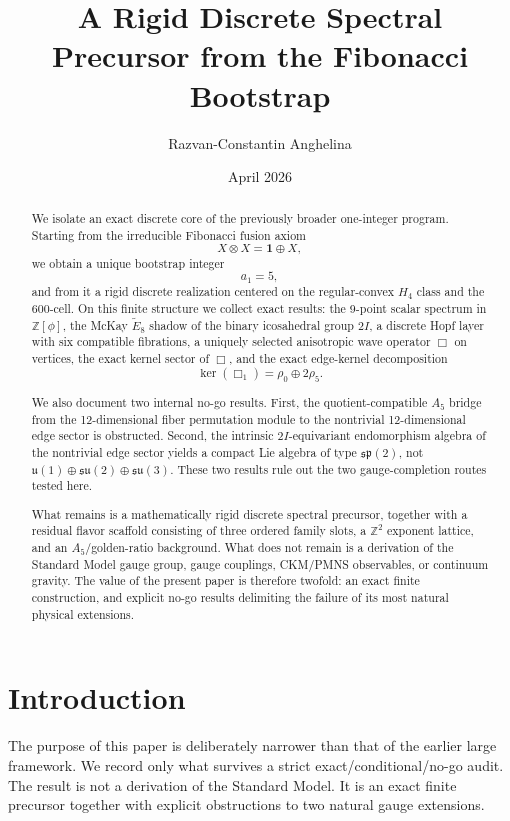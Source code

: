 \documentclass[12pt,a4paper]{article}
\title{\textbf{A Rigid Discrete Spectral Precursor from the Fibonacci Bootstrap}}
\author{Razvan-Constantin Anghelina}
\date{April 2026}
\theoremstyle{definition}
\begin{document}
\maketitle

\begin{abstract}
We isolate an exact discrete core of the previously broader one-integer program.
Starting from the irreducible Fibonacci fusion axiom
\[
X \otimes X = \mathbf{1} \oplus X,
\]
we obtain a unique bootstrap integer
\[
a_1 = 5,
\]
and from it a rigid discrete realization centered on the regular-convex
\(H_4\) class and the 600-cell. On this finite structure we collect exact
results: the 9-point scalar spectrum in \(\mathbb{Z}[\phi]\), the McKay
\(\widetilde E_8\) shadow of the binary icosahedral group \(2I\), a discrete
Hopf layer with six compatible fibrations, a uniquely selected anisotropic wave
operator \(\Box\) on vertices, the exact kernel sector of \(\Box\), and the
exact edge-kernel decomposition
\[
\ker(\Box_1)=\rho_0 \oplus 2\rho_5.
\]

We also document two internal no-go results. First, the quotient-compatible
\(A_5\) bridge from the 12-dimensional fiber permutation module to the
nontrivial 12-dimensional edge sector is obstructed. Second, the intrinsic
\(2I\)-equivariant endomorphism algebra of the nontrivial edge sector yields a
compact Lie algebra of type \(\mathfrak{sp}(2)\), not
\(\mathfrak{u}(1)\oplus\mathfrak{su}(2)\oplus\mathfrak{su}(3)\). These two
results rule out the two gauge-completion routes tested here.

What remains is a mathematically rigid discrete spectral precursor, together
with a residual flavor scaffold consisting of three ordered family slots, a
\(\mathbb{Z}^2\) exponent lattice, and an \(A_5\)/golden-ratio background.
What does not remain is a derivation of the Standard Model gauge group, gauge
couplings, CKM/PMNS observables, or continuum gravity. The value of the present
paper is therefore twofold: an exact finite construction, and explicit no-go
results delimiting the failure of its most natural physical extensions.
\end{abstract}

\tableofcontents
\newpage

\section{Introduction}

The purpose of this paper is deliberately narrower than that of the earlier
large framework. We record only what survives a strict exact/conditional/no-go
audit. The result is not a derivation of the Standard Model. It is an exact
finite precursor together with explicit obstructions to two natural gauge
extensions.
\end{document}
